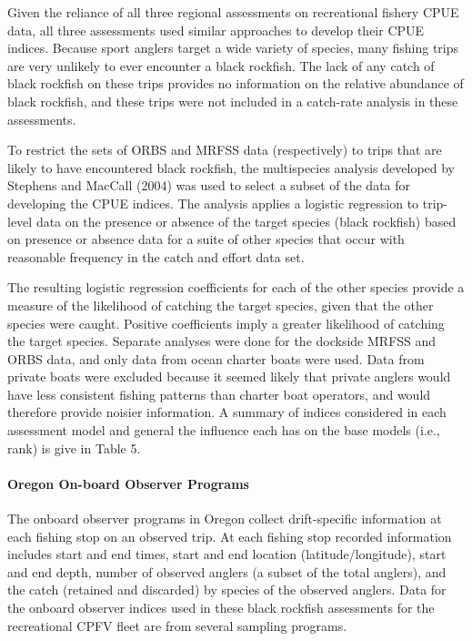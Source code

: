\documentclass[11pt,
  english,
  letterpaper,
]{article}
\begin{document}
Given the reliance of all three regional assessments on recreational fishery CPUE data, all three assessments used similar approaches to develop their CPUE indices. Because sport anglers target a wide variety of species, many fishing trips are very unlikely to ever encounter a black rockfish. The lack of any catch of black rockfish on these trips provides no information on the relative abundance of black rockfish, and these trips were not included in a catch-rate analysis in these assessments.

To restrict the sets of ORBS and MRFSS data (respectively) to trips that are likely to have encountered black rockfish, the multispecies analysis developed by Stephens and MacCall (2004) was used to select a subset of the data for developing the CPUE indices. The analysis applies a logistic regression to trip-level data on the presence or absence of the target species (black rockfish) based on presence or absence data for a suite of other species that occur with reasonable frequency in the catch and effort data set.

The resulting logistic regression coefficients for each of the other species provide a measure of the likelihood of catching the target species, given that the other species were caught. Positive coefficients imply a greater likelihood of catching the target species. Separate analyses were done for the dockside MRFSS and ORBS data, and only data from ocean charter boats were used. Data from private boats were excluded because it seemed likely that private anglers would have less consistent fishing patterns than charter boat operators, and would therefore provide noisier information. A summary of indices considered in each assessment model and general the influence each has on the base models (i.e., rank) is give in Table 5.

\hypertarget{oregon-on-board-observer-programs}{%
\paragraph{Oregon On-board Observer Programs}\label{oregon-on-board-observer-programs}}

The onboard observer programs in Oregon collect drift-specific information at each fishing stop on an observed trip. At each fishing stop recorded information includes start and end times, start and end location (latitude/longitude), start and end depth, number of observed anglers (a subset of the total anglers), and the catch (retained and discarded) by species of the observed anglers. Data for the onboard observer indices used in these black rockfish assessments for the recreational CPFV fleet are from several sampling programs.
\end{document}
